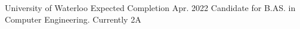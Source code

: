 

\begin{cventries}

  \cventry
    {} %
    {University of Waterloo} %
    {} %
    {Expected Completion Apr. 2022} %
    {Candidate for B.AS. in Computer Engineering. Currently 2A}

\end{cventries}
